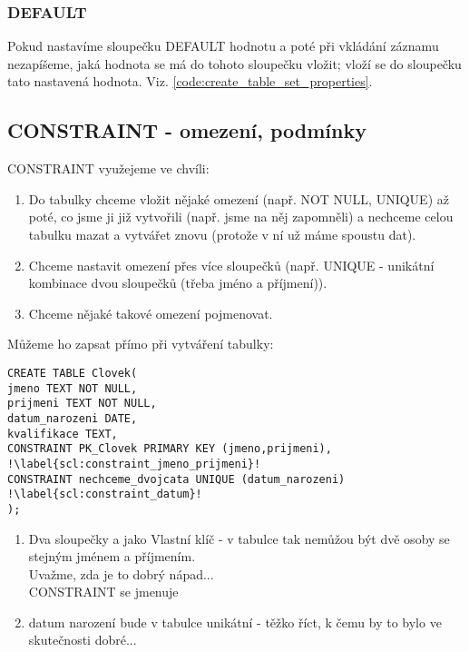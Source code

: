\subsubsection{DEFAULT}
Pokud nastavíme sloupečku DEFAULT hodnotu a poté při vkládání záznamu nezapíšeme, jaká hodnota se má do tohoto sloupečku vložit; vloží se do sloupečku tato nastavená hodnota. Viz. \ref{code:create_table_set_properties}.

\subsection{CONSTRAINT - omezení, podmínky}
CONSTRAINT využejeme ve chvíli:
\begin{enumerate}
\item Do tabulky chceme vložit nějaké omezení (např. NOT NULL, UNIQUE) až poté, co jsme ji již vytvořili (např. jsme na něj zapomněli) a nechceme celou tabulku mazat a vytvářet znovu (protože v ní už máme spoustu dat).
\item Chceme nastavit omezení přes více sloupečků (např. UNIQUE - unikátní kombinace dvou sloupečků (třeba jméno a příjmení)).
\item Chceme nějaké takové omezení pojmenovat.
\end{enumerate}

Můžeme ho zapsat přímo při vytváření tabulky:\\

\begin{minipage}[t]{.45\textwidth}
\begin{code}
\begin{verbatim}
CREATE TABLE Clovek( 
jmeno TEXT NOT NULL,
prijmeni TEXT NOT NULL,
datum_narozeni DATE,
kvalifikace TEXT,
CONSTRAINT PK_Clovek PRIMARY KEY (jmeno,prijmeni), !\label{scl:constraint_jmeno_prijmeni}!
CONSTRAINT nechceme_dvojcata UNIQUE (datum_narozeni) !\label{scl:constraint_datum}!
);
\end{verbatim}
\label{code:constraint_primo}
\end{code}
\end{minipage}
\begin{minipage}[t]{.45\textwidth}
\vspace{-1cm}
\begin{enumerate}
\item[ř. \ref{scl:constraint_jmeno_prijmeni}:] Dva sloupečky  a  jako Vlastní klíč - v tabulce tak nemůžou být dvě osoby se stejným jménem a příjmením.\\Uvažme, zda je to dobrý nápad...\\
CONSTRAINT se jmenuje 
\vspace{1cm}
\item[ř. \ref{scl:constraint_datum}] datum narození bude v tabulce unikátní - těžko říct, k čemu by to bylo ve skutečnosti dobré... 
\end{enumerate} 
\end{minipage}

